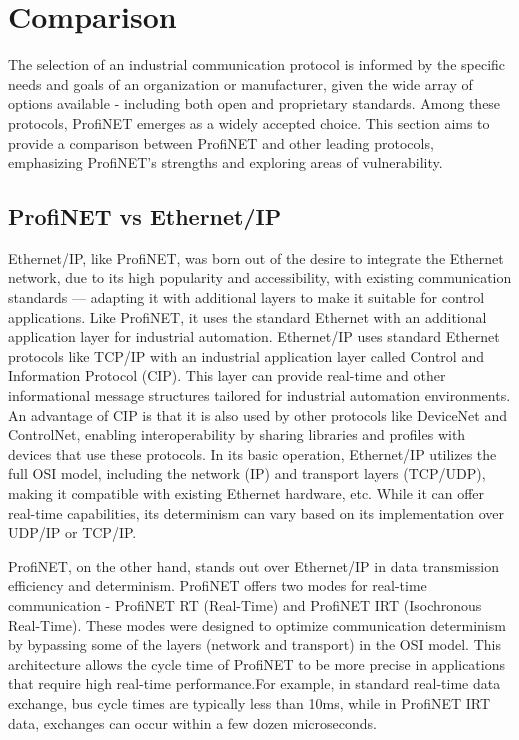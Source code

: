 \documentclass[conference]{IEEEtran}
\begin{document}
\section{Comparison}
The selection of an industrial communication protocol is informed by the specific needs and goals of an organization or manufacturer, given the wide array of options available - including both open and proprietary standards. Among these protocols, ProfiNET emerges as a widely accepted choice. This section aims to provide a comparison between ProfiNET and other leading protocols, emphasizing ProfiNET's strengths and exploring areas of vulnerability. 

\subsection{ProfiNET vs Ethernet/IP}
Ethernet/IP, like ProfiNET, was born out of the desire to integrate the Ethernet network, due to its high popularity and accessibility, with existing communication standards — adapting it with additional layers to make it suitable for control applications. Like ProfiNET, it uses the standard Ethernet with an additional application layer for industrial automation. Ethernet/IP uses standard Ethernet protocols like TCP/IP with an industrial application layer called Control and Information Protocol (CIP). This layer can provide real-time and other informational message structures tailored for industrial automation environments. An advantage of CIP is that it is also used by other protocols like DeviceNet and ControlNet, enabling interoperability by sharing libraries and profiles with devices that use these protocols\cite{Acromag2020EthernetIP}. In its basic operation, Ethernet/IP utilizes the full OSI model, including the network (IP) and transport layers (TCP/UDP), making it compatible with existing Ethernet hardware, etc. While it can offer real-time capabilities, its determinism can vary based on its implementation over UDP/IP or TCP/IP.

ProfiNET, on the other hand, stands out over Ethernet/IP in data transmission efficiency and determinism. ProfiNET offers two modes for real-time communication - ProfiNET RT (Real-Time) and ProfiNET IRT (Isochronous Real-Time). These modes were designed to optimize communication determinism by bypassing some of the layers (network and transport) in the OSI model\cite{ProfinetCommunicationChannels}. This architecture allows the cycle time of ProfiNET to be more precise in applications that require high real-time performance.For example, in standard real-time data exchange,  bus cycle times are typically less than 10ms, while in ProfiNET IRT data, exchanges can occur within a few dozen microseconds\cite{Eitel2020EtherNetVsPROFINET}.
\end{document}
